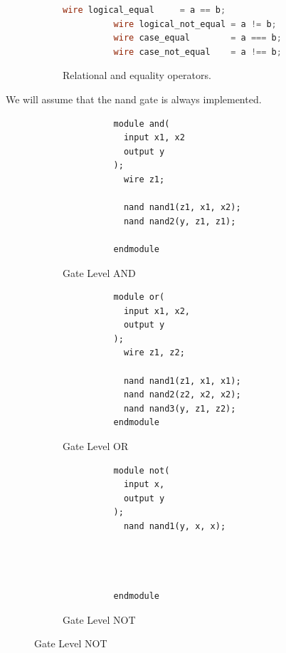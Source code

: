 \begin{definition}
\begin{figure}[H]
\begin{subfigure}[b]{0.48\textwidth}
\begin{lstlisting}[language=Verilog]
          wire logical_equal     = a == b;  
          wire logical_not_equal = a != b;  
          wire case_equal        = a === b; 
          wire case_not_equal    = a !== b; 
        \end{lstlisting}
        \caption{Relational and equality operators.}
      \end{subfigure}
      \caption{}
    \end{figure}
  \end{definition}

  We will assume that the nand gate is always implemented. 

  \begin{definition}
    \begin{figure}[H]
      \centering 
      \begin{subfigure}[b]{0.32\textwidth}
        \centering
        \begin{lstlisting}
          module and(
            input x1, x2
            output y
          );
            wire z1;

            nand nand1(z1, x1, x2);
            nand nand2(y, z1, z1);

          endmodule
        \end{lstlisting}
        \caption{Gate Level AND}
      \end{subfigure}
      \hfill 
      \begin{subfigure}[b]{0.32\textwidth}
        \centering
        \begin{lstlisting}
          module or(
            input x1, x2, 
            output y
          ); 
            wire z1, z2;

            nand nand1(z1, x1, x1);
            nand nand2(z2, x2, x2); 
            nand nand3(y, z1, z2);
          endmodule
        \end{lstlisting}
        \caption{Gate Level OR}
      \end{subfigure}
      \hfill 
      \begin{subfigure}[b]{0.32\textwidth}
        \centering
        \begin{lstlisting}
          module not(
            input x, 
            output y
          ); 
            nand nand1(y, x, x);




          endmodule
        \end{lstlisting}
        \caption{Gate Level NOT}
      \end{subfigure}


\end{figure}
\end{definition}
